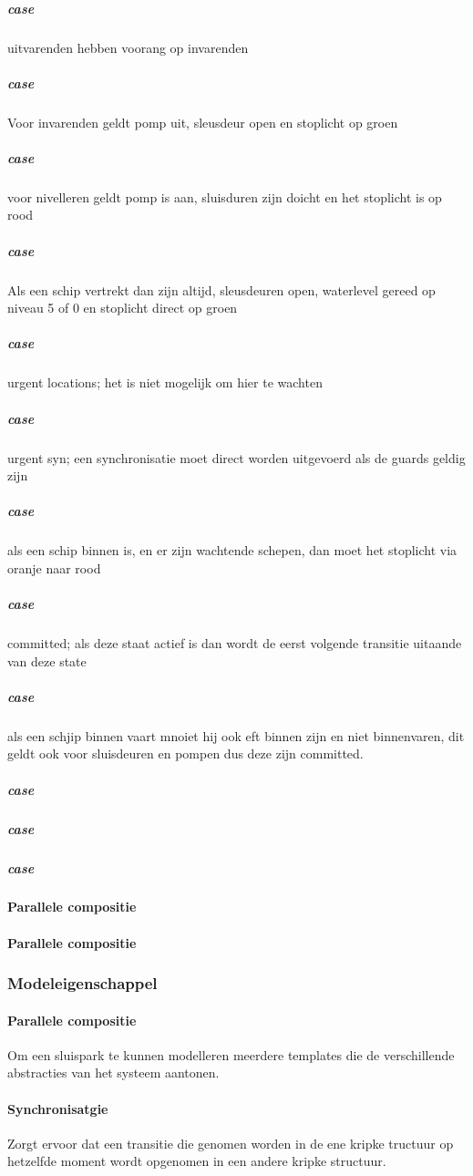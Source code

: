 \subparagraph{case}
uitvarenden hebben voorang op invarenden

\subparagraph{case}
Voor invarenden geldt pomp uit, sleusdeur open en stoplicht op groen
\subparagraph{case}
voor nivelleren geldt pomp is aan, sluisduren zijn doicht en het stoplicht is op rood
\subparagraph{case}
Als een schip vertrekt dan zijn altijd, sleusdeuren open, waterlevel gereed op niveau 5 of 0 en stoplicht direct op groen
\subparagraph{case}
urgent locations; het is niet mogelijk om hier te wachten
\subparagraph{case}
urgent syn; een synchronisatie moet direct worden uitgevoerd als de guards geldig zijn

\subparagraph{case}
als een schip binnen is, en er zijn wachtende schepen, dan moet het stoplicht via oranje naar rood
\subparagraph{case}
committed; als deze staat actief is dan wordt de eerst volgende transitie uitaande van deze state
\subparagraph{case}
als een schjip binnen vaart mnoiet hij ook eft binnen zijn en niet binnenvaren, dit geldt ook voor sluisdeuren en pompen dus deze zijn committed.
\subparagraph{case}

\subparagraph{case}

\subparagraph{case}

\paragraph{Parallele compositie}


\paragraph{Parallele compositie}

\subsubsection{Modeleigenschappel}
\paragraph{Parallele compositie}
Om een sluispark te kunnen modelleren meerdere templates die de verschillende abstracties van het systeem aantonen.

\paragraph{Synchronisatgie}
Zorgt ervoor dat  een transitie die genomen worden in de ene kripke tructuur op hetzelfde moment wordt opgenomen in een andere kripke structuur.



